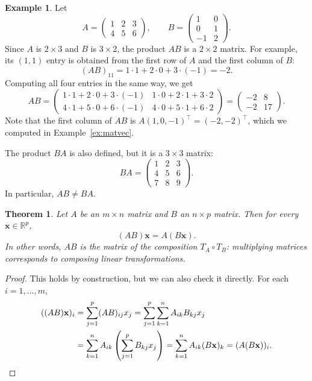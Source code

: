 \documentclass[11pt]{article}
\theoremstyle{definition}
\newtheorem{example}[definition]{Example}
\theoremstyle{plain}
\newtheorem{theorem}[definition]{Theorem}
\theoremstyle{remark}
\begin{document}
\begin{example}
    Let
    \[A = \begin{pmatrix}
        1 & 2 & 3 \\
        4 & 5 & 6
    \end{pmatrix}, \qquad B = \begin{pmatrix}
        1 & 0 \\
        0 & 1 \\
        -1 & 2
    \end{pmatrix}.\]
    Since $A$ is $2 \times 3$ and $B$ is $3 \times 2$, the product $AB$ is a $2 \times 2$ matrix. For example, its $(1, 1)$ entry is obtained from the first row of $A$ and the first column of $B$:
    \[(AB)_{11} = 1 \cdot 1 + 2 \cdot 0 + 3 \cdot (-1) = -2.\]
    Computing all four entries in the same way, we get
    \[AB = \begin{pmatrix}
        1 \cdot 1 + 2 \cdot 0 + 3 \cdot (-1) & 1 \cdot 0 + 2 \cdot 1 + 3 \cdot 2 \\
        4 \cdot 1 + 5 \cdot 0 + 6 \cdot (-1) & 4 \cdot 0 + 5 \cdot 1 + 6 \cdot 2
    \end{pmatrix} = \begin{pmatrix}
        -2 & 8 \\
        -2 & 17
    \end{pmatrix}.\]
    Note that the first column of $AB$ is $A(1, 0, -1)^\top = (-2, -2)^\top$, which we computed in Example~\ref{ex:matvec}.

    The product $BA$ is also defined, but it is a $3 \times 3$ matrix:
    \[BA = \begin{pmatrix}
        1 & 2 & 3 \\
        4 & 5 & 6 \\
        7 & 8 & 9
    \end{pmatrix}.\]
    In particular, $AB \neq BA$.
\end{example}

\begin{theorem}\label{thm:composition}
    Let $A$ be an $m \times n$ matrix and $B$ an $n \times p$ matrix. Then for every $\mathbf{x} \in \mathbb{R}^p$,
    \[(AB)\mathbf{x} = A(B\mathbf{x}).\]
    In other words, $AB$ is the matrix of the composition $T_A \circ T_B$: multiplying matrices corresponds to composing linear transformations.
\end{theorem}

\begin{proof}
    This holds by construction, but we can also check it directly. For each $i = 1, \ldots, m$,
    \begin{align*}
        ((AB)\mathbf{x})_i &= \sum_{j=1}^p (AB)_{ij} x_j = \sum_{j=1}^p \sum_{k=1}^n A_{ik} B_{kj} x_j \\
        &= \sum_{k=1}^n A_{ik} \left(\sum_{j=1}^p B_{kj} x_j\right) = \sum_{k=1}^n A_{ik} (B\mathbf{x})_k = (A(B\mathbf{x}))_i. \qedhere
    \end{align*}
\end{proof}
\end{document}
